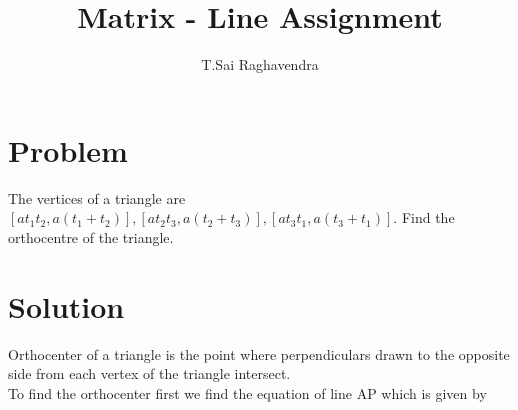 \documentclass[journal,12pt,twocolumn]{IEEEtran}
\title{\mytitle}
\title{
Matrix - Line Assignment
}
\author{T.Sai Raghavendra}
\begin{document}
\maketitle
\tableofcontents
\bigskip


\section{\textbf{Problem}}
The vertices of a triangle are $ [at_1t_2,a(t_1+t_2)],[at_2t_3,a(t_2+t_3)],[at_3t_1,a(t_3+t_1)] $. Find the orthocentre of the triangle.\\


\section{\textbf{Solution}}
Orthocenter of a triangle is the point where perpendiculars drawn to the opposite side from each vertex of the triangle intersect.   \\

To find the orthocenter first we find the equation of line AP which is given by\\
\end{document}
